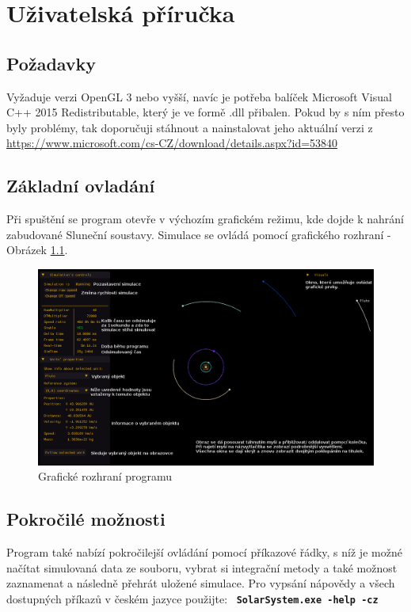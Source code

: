 \chapter{Uživatelská příručka}
\label{chap:userGuide}
\section{Požadavky}
Vyžaduje verzi OpenGL 3 nebo vyšší, navíc je potřeba balíček Microsoft Visual C++ 2015 Redistributable, který je ve formě .dll přibalen. Pokud by s ním přesto byly problémy, tak doporučuji stáhnout  a nainstalovat jeho aktuální verzi z \url{https://www.microsoft.com/cs-CZ/download/details.aspx?id=53840}
\section{Základní ovladání}
Při spuštění se program otevře v výchozím grafickém režimu, kde dojde k nahrání zabudované Sluneční soustavy. Simulace se ovládá pomocí grafického rozhraní - Obrázek \ref{fig:GUI1}.\\
\begin{figure}
	\caption{Grafické rozhraní programu}
	\label{fig:GUI1} 
	\centering
	\includegraphics[scale=0.5]{Figs/GUI1_edited}
\end{figure}
\FloatBarrier
\section{Pokročilé možnosti}
Program také nabízí pokročilejší ovládání pomocí příkazové řádky, s níž je možné načítat simulovaná data ze souboru, vybrat si integrační metody a také možnost zaznamenat a následně přehrát uložené simulace.
Pro vypsání nápovědy a všech dostupných příkazů v českém jazyce použijte:
\ \texttt{\textbf{SolarSystem.exe -help -cz}}

